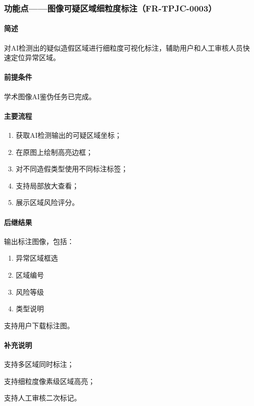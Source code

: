{\color{black}
\subsubsection{功能点——图像可疑区域细粒度标注（FR-TPJC-0003）}

\paragraph*{简述}

对AI检测出的疑似造假区域进行细粒度可视化标注，辅助用户和人工审核人员快速定位异常区域。

\paragraph*{前提条件}

学术图像AI鉴伪任务已完成。

\paragraph*{主要流程}

\begin{enumerate}
    \item 获取AI检测输出的可疑区域坐标；
    \item 在原图上绘制高亮边框；
    \item 对不同造假类型使用不同标注标签；
    \item 支持局部放大查看；
    \item 展示区域风险评分。
\end{enumerate}

\paragraph*{后继结果}

输出标注图像，包括：

\begin{enumerate}
    \item 异常区域框选
    \item 区域编号
    \item 风险等级
    \item 类型说明
\end{enumerate}

支持用户下载标注图。

\paragraph*{补充说明}

支持多区域同时标注；

支持细粒度像素级区域高亮；

支持人工审核二次标记。
}


